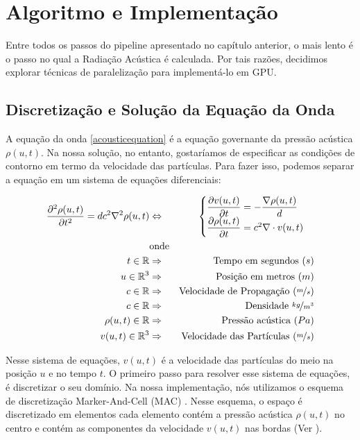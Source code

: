 \chapter{Algoritmo e Implementação}

Entre todos os passos do pipeline apresentado no capítulo anterior, o mais lento é o passo no qual a Radiação Acústica é calculada. Por tais razões, decidimos explorar técnicas de paralelização para implementá-lo em GPU.

\section {Discretização e Solução da Equação da Onda}

A equação da onda \eqref{acousticequation} é a equação governante da pressão acústica $\rho(u, t)$. Na nossa solução, no entanto, gostaríamos de especificar as condições de contorno em termo da velocidade das partículas. Para fazer isso, podemos separar a equação em um sistema de equações diferenciais:

\begin{eqnarray} \label{eq:wave_equation_velocity}
	\frac{\partial^2 \rho(u, t)}{\partial t^2} = dc^2 \nabla^2 \rho(u, t)
	&\Leftrightarrow&
	\begin{cases}
		\dfrac{\partial v(u, t)}{\partial t} = -\dfrac{\nabla \rho(u, t)}{d}\\
		\dfrac{\partial \rho(u, t)}{\partial t} = c^2 \nabla \cdot v(u, t)	
	\end{cases}\\
	&\text{onde}&\nonumber\\
	t \in \mathbb{R} &\Rightarrow& \text{Tempo em segundos }(s) \nonumber\\
	u \in \mathbb{R}^3 &\Rightarrow& \text{Posição em metros }(m) \nonumber\\
	c \in \mathbb{R} &\Rightarrow& \text{Velocidade de Propagação }(\nicefrac{m}{s}) \nonumber\\
	c \in \mathbb{R} &\Rightarrow& \text{Densidade } \nicefrac{kg}{m^3} \nonumber\\
	\rho(u, t) \in \mathbb{R} &\Rightarrow& \text{Pressão acústica }(Pa) \nonumber\\
	v(u, t) \in \mathbb{R}^3 &\Rightarrow& \text{Velocidade das Partículas } (\nicefrac{m}{s})\nonumber
\end{eqnarray}

Nesse sistema de equações, $v(u, t)$ é a velocidade das partículas do meio na posição $u$ e no tempo $t$. O primeiro passo para resolver esse sistema de equações, é discretizar o seu domínio. Na nossa implementação, nós utilizamos o esquema de discretização Marker-And-Cell (MAC) \cite{welch1966mac}. Nesse esquema, o espaço é discretizado em elementos cada elemento contém a pressão acústica $\rho(u, t)$ no centro e contém as componentes da velocidade $v(u, t)$ nas bordas (Ver ).

